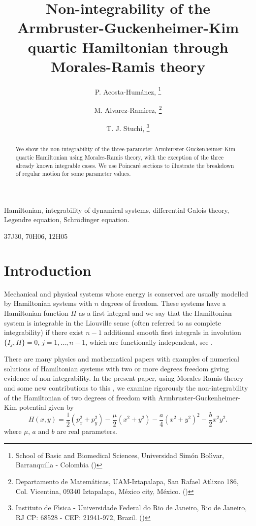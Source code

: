 \documentclass[final]{siamart0516}
\title{Non-integrability of  the   Armbruster-Guckenheimer-Kim quartic Hamiltonian  through Morales-Ramis theory}
\author{P. Acosta-Hum\'anez, 
\thanks{School of Basic and Biomedical Sciences, Universidad Sim\'on Bol\'{\i}var,
Barranquilla - Colombia (\email{primitivo.acosta@unisimonbolivar.edu.co;\,\, primi@intelectual.co})}
  \and
M. Alvarez-Ram\'{\i}rez, \thanks{Departamento de Matem\'aticas, UAM-Iztapalapa, San Rafael Atlixco 186, Col. Vicentina, 09340 Iztapalapa, M\'exico city, M\'exico. (\email{mar@xanum.uam.mx})}
  \and
T. J. Stuchi, \thanks{Instituto de F\'{\i}sica - Universidade Federal do Rio de Janeiro, Rio de Janeiro, RJ CP: 68528 - CEP: 21941-972, Brazil.
(\email{tstuchi@if.ufrj.br})}}
\begin{document}
\maketitle


\begin{abstract}
We show the non-integrability of the three-parameter   Armburster-Guckenheimer-Kim quartic Hamiltonian using 
Morales-Ramis theory, with the exception of the three already known integrable cases.  We use
Poincar\'e sections to illustrate the breakdown of regular motion for some parameter values. 
\end{abstract}

\begin{keywords}
Hamiltonian, integrability of dynamical systems, differential Galois theory, Legendre equation,  Schr\"odinger equation.
\end{keywords}

\begin{AMS}
37J30, 70H06, 12H05
\end{AMS}

\section{Introduction}
Mechanical and physical systems whose energy is conserved are  usually modelled by Hamiltonian systems with $n$ degrees of freedom.  
These systems have  a Hamiltonian function $H$ as  a first integral and we say that the Hamiltonian system is integrable in the Liouville sense (often referred to as complete integrability) if there exist $n-1$ 
additional smooth first integrals in involution  $\{I_j,H\}=0$, $j=1,\dots ,n-1$, which are functionally independent, see \cite{am}.

There are many physics and mathematical papers  with examples of numerical solutions of Hamiltonian systems with two or more degrees freedom 
 giving evidence of non-integrability. In the present paper,  using  Morales-Ramis theory \cite{morales} and some new contributions to this ,  we examine rigorously 
 the non-integrability  of the Hamiltonian of two degrees of freedom with Armbruster-Guckenheimer-Kim potential given by
\begin{equation}\label{ham-agk}
H(x,y)= \frac{1}{2}(p_x^2+p_y^2) -\frac{\mu}{2}(x^2+y^2)-\frac{a}{4} (x^2+y^2)^2- \frac{b}{2} x^2y^2.
\end{equation}
where $\mu$, $a$ and  $b$ are real parameters. 
\end{document}
